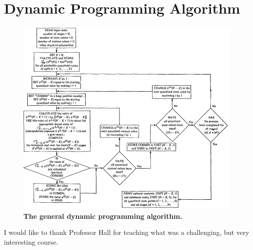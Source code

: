\documentclass[twocolumn,letterpaper]{IEEEAerospaceCLS}  %
\begin{document}
\section{Dynamic Programming Algorithm}        %
\begin{figure}
	\centering
	\includegraphics[width=7.5in]{kirk_algo.png}
	\caption{\bf{The general dynamic programming algorithm. }}
\end{figure} \cite{Kirk1971}

\acknowledgments
I would like to thank Professor Hall for teaching what was a challenging, but very interesting course.




\end{document}
